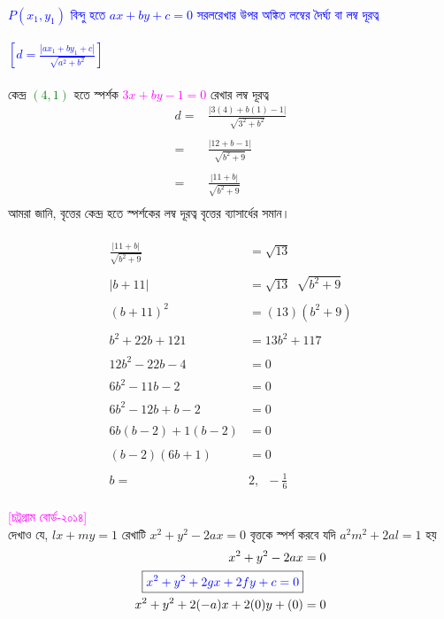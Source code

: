 \documentclass{article}
\begin{document}
\\   
\textcolor{blue}{$P(x_1,y_1)$ বিন্দু হতে  $ax+by+c=0$ সরলরেখার উপর অঙ্কিত লম্বের দৈর্ঘ্য বা লম্ব দূরত্ব \\
	\\
	$\left[d=\frac{|ax_1+by_1+c|}{\sqrt{a^2+b^2}}\right]$}\\
\\
কেন্দ্র \textcolor{green}{$(4,1)$} হতে স্পর্শক \textcolor{magenta}{$3x+by-1=0$}  রেখার লম্ব দূরত্ব \\
\begin{align*}
	d=	&\frac{|3(4)+b(1)-1|}{\sqrt{3^2+b^2}}\\
	\\
	=	&	\frac{|12+b-1|}{\sqrt{b^2+9}}\\
	\\
	=	&	\frac{|11+b|}{\sqrt{b^2+9}}\\
\end{align*}
আমরা জানি, বৃত্তের কেন্দ্র হতে স্পর্শকের লম্ব দূরত্ব বৃত্তের ব্যাসার্ধের সমান। \\
\\ 
\begin{align*}
	\frac{|11+b|}{\sqrt{b^2+9}}&=\sqrt{13}\\
	\\
	|b+11|&=\sqrt{13}\,\,\,\sqrt{b^2+9}\\
	\\
	(b+11)^2&= (13)(b^2+9)\\
	\\
	b^2+22b+121&=13b^2+117\\
	\\
	12b^2-22b-4&=0\\
	\\
	6b^2-11b-2&=0\\
	\\
	6b^2-12b+b-2&=0\\
	\\
	6b(b-2)+1(b-2)&=0\\
	\\
	(b-2)(6b+1)&=0\\
	\\
	b=&2,\,\,\,-\frac{1}{6}
\end{align*}
\\ 
\textcolor{magenta}{[চট্রগ্রাম বোর্ড-২০১৪]}\\
দেখাও যে, $lx+my=1$ রেখাটি $x^2+y^2-2ax=0$ বৃত্তকে স্পর্শ করবে যদি $a^2m^2+2al=1$ হয়\\
	\begin{align*}
	x^2+y^2-2ax&=0\\
	\boxed{\textcolor{blue}{x^2+y^2+2gx+2fy+c=0}}&\\
	x^2+y^2+2(-a)x+2(0)y+(0)&=0
\end{align*}
\end{document}
